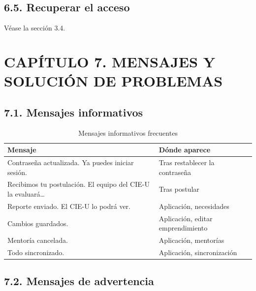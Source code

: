 \documentclass[12pt,letterpaper]{article}
\begin{document}
\subsection*{6.5. Recuperar el acceso}


Véase la sección 3.4.

\clearpage

\section*{CAPÍTULO 7. MENSAJES Y SOLUCIÓN DE PROBLEMAS}


\subsection*{7.1. Mensajes informativos}


\begin{table}[H]\singlespacing\small
\caption{Mensajes informativos frecuentes}
\begin{tabularx}{\textwidth}{XX}
\toprule
\textbf{Mensaje} & \textbf{Dónde aparece} \\
\midrule
\relax Contraseña actualizada. Ya puedes iniciar sesión. & Tras restablecer la contraseña \\
\relax Recibimos tu postulación. El equipo del CIE-U la evaluará\ldots{} & Tras postular \\
\relax Reporte enviado. El CIE-U lo podrá ver. & Aplicación, necesidades \\
\relax Cambios guardados. & Aplicación, editar emprendimiento \\
\relax Mentoría cancelada. & Aplicación, mentorías \\
\relax Todo sincronizado. & Aplicación, sincronización \\
\bottomrule
\end{tabularx}
\end{table}

\subsection*{7.2. Mensajes de advertencia}

\end{document}
